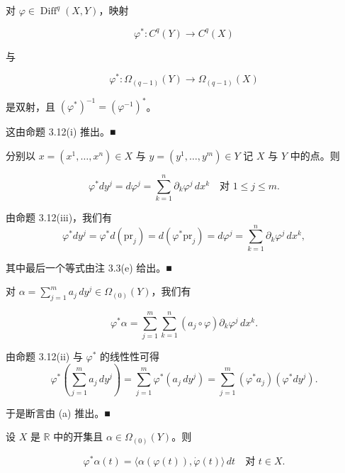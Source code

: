 \begin{corollary}

对 $ \varphi \in \operatorname{Diff}^{q}(X,Y) $，映射

\[
\varphi^{*} : C^{q}(Y) \to C^{q}(X)
\]

与

\[
\varphi^{*} : \Omega_{(q-1)}(Y) \to \Omega_{(q-1)}(X)
\]

是双射，且 $ (\varphi^{*})^{-1} = (\varphi^{-1})^{*} $。

\proofhead
这由命题 3.12(i) 推出。\nobreak\hspace{0.35em}■
\end{corollary}

\begin{example}

\begin{items}
\item

分别以 $ x = (x^{1},\ldots,x^{n}) \in X $ 与 $ y = (y^{1},\ldots,y^{m}) \in Y $ 记 $ X $ 与 $ Y $ 中的点。则

\[
\varphi^{*}dy^{j} = d\varphi^{j} = \sum_{k=1}^{n}\partial_{k}\varphi^{j}\,dx^{k} \quad \text{对 } 1 \le j \le m .
\]

\proofhead
由命题 3.12(iii)，我们有
\[
\varphi^{*}dy^{j} = \varphi^{*}d(\mathrm{pr}_{j}) = d(\varphi^{*}\mathrm{pr}_{j}) = d\varphi^{j} = \sum_{k=1}^{n}\partial_{k}\varphi^{j}\,dx^{k} ,
\]

其中最后一个等式由注 3.3(e) 给出。\nobreak\hspace{0.35em}■

\item

对 $ \alpha = \sum_{j=1}^{m}a_{j}\,dy^{j} \in \Omega_{(0)}(Y) $，我们有

\[
\varphi^{*}\alpha = \sum_{j=1}^{m}\sum_{k=1}^{n}(a_{j}\circ\varphi)\partial_{k}\varphi^{j}\,dx^{k} .
\]

\proofhead
由命题 3.12(ii) 与 $ \varphi^{*} $ 的线性性可得
\[
\varphi^{*}\left( \sum_{j=1}^{m}a_{j}\,dy^{j} \right) = \sum_{j=1}^{m}\varphi^{*}(a_{j}\,dy^{j}) = \sum_{j=1}^{m}(\varphi^{*}a_{j})(\varphi^{*}dy^{j}) .
\]

于是断言由 (a) 推出。\nobreak\hspace{0.35em}■

\item

设 $ X $ 是 $ \mathbb{R} $ 中的开集且 $ \alpha \in \Omega_{(0)}(Y) $。则

\[
\varphi^{*}\alpha(t) = \langle\alpha(\varphi(t)),\dot{\varphi}(t)\rangle\,dt \quad \text{对 } t \in X .
\]


\end{items}
\end{example}
